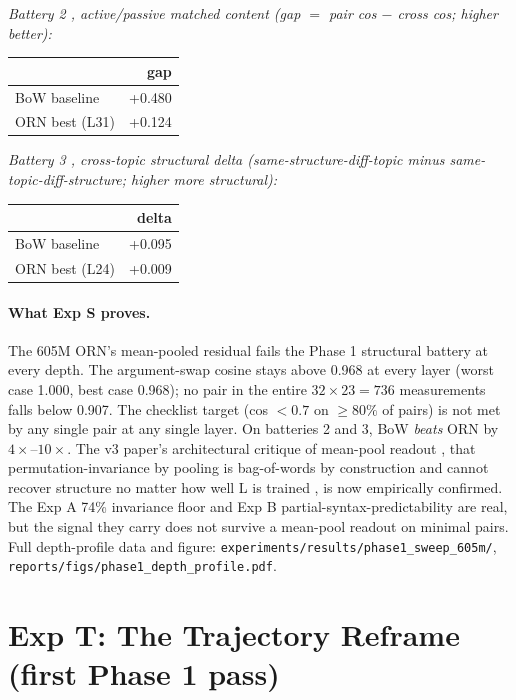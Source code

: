 \documentclass[10pt, twocolumn, a4paper]{article}
\begin{document}
\emph{Battery 2 ,  active/passive matched content (gap $= $ pair cos $-$ cross cos; higher better):}
\begin{center}\small
\begin{tabular}{lr}
\toprule
 & gap \\
\midrule
BoW baseline & +0.480 \\
ORN best (L31) & +0.124 \\
\bottomrule
\end{tabular}
\end{center}

\emph{Battery 3 ,  cross-topic structural delta (same-structure-diff-topic minus same-topic-diff-structure; higher more structural):}
\begin{center}\small
\begin{tabular}{lr}
\toprule
 & delta \\
\midrule
BoW baseline & +0.095 \\
ORN best (L24) & +0.009 \\
\bottomrule
\end{tabular}
\end{center}

\paragraph{What Exp S proves.} The 605M ORN's mean-pooled residual fails the Phase 1 structural battery at every depth. The argument-swap cosine stays above 0.968 at every layer (worst case 1.000, best case 0.968); no pair in the entire $32 \times 23 = 736$ measurements falls below 0.907. The checklist target (cos $< 0.7$ on $\geq 80\%$ of pairs) is not met by any single pair at any single layer. On batteries 2 and 3, BoW \emph{beats} ORN by $4\times$--$10\times$. The v3 paper's architectural critique of mean-pool readout ,  that permutation-invariance by pooling is bag-of-words by construction and cannot recover structure no matter how well L is trained ,  is now empirically confirmed. The Exp A 74\% invariance floor and Exp B partial-syntax-predictability are real, but the signal they carry does not survive a mean-pool readout on minimal pairs. Full depth-profile data and figure: \texttt{experiments/results/phase1\_sweep\_605m/}, \texttt{reports/figs/phase1\_depth\_profile.pdf}.

\section{Exp T: The Trajectory Reframe (first Phase 1 pass)}
\label{sec:trajsmoke}
\end{document}
